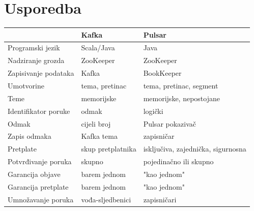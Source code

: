 \documentclass[utf8, diplomski, lmodern, numeric]{fer}
\begin{document}
\section{Usporedba}

\begin{table}[H]

\begin{adjustwidth}{-15mm}{15mm}

\begin{tabular}{|l|l|l|}
\hline
                            & \textbf{Kafka}                & \textbf{Pulsar}                                \\ \hline
Programski jezik            & Scala/Java                    & Java                                           \\ \hline
Nadziranje grozda           & ZooKeeper                     & ZooKeeper                                      \\ \hline
Zapisivanje podataka        & Kafka                         & BookKeeper                                     \\ \hline
Umotvorine                  & tema, pretinac                & tema, pretinac, segment                        \\ \hline
Teme                        & memorijske                    & memorijske, nepostojane                        \\ \hline
Identifikator poruke        & odmak                         & logički                                        \\ \hline
Odmak                       & cijeli broj                   & Pulsar pokazivač                               \\ \hline
Zapis odmaka                & Kafka tema                    & zapisničar                                     \\ \hline
Pretplate                   & skup pretplatnika             & isključiva, zajednička, sigurnosna             \\ \hline
Potvrđivanje poruka         & skupno                        & pojedinačno ili skupno                         \\ \hline
Garancija objave            & barem jednom                  & "kao jednom"                                   \\ \hline
Garancija pretplate         & barem jednom                  & "kao jednom"                                   \\ \hline
Umnožavanje poruka          & vođa-sljedbenici              & zapisničari                                    \\ \hline

\end{tabular}
\end{adjustwidth}
\end{table}
\end{document}
